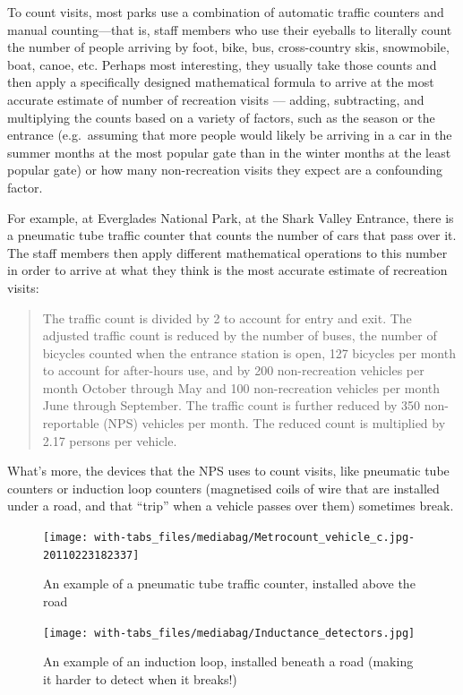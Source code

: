\documentclass[
  letterpaper,
  DIV=11,
  numbers=noendperiod]{scrartcl}
\begin{document}
To count visits, most parks use a combination of automatic traffic
counters and manual counting---that is, staff members who use their
eyeballs to literally count the number of people arriving by foot, bike,
bus, cross-country skis, snowmobile, boat, canoe, etc. Perhaps most
interesting, they usually take those counts and then apply a
specifically designed mathematical formula to arrive at the most
accurate estimate of number of recreation visits --- adding,
subtracting, and multiplying the counts based on a variety of factors,
such as the season or the entrance (e.g.~assuming that more people would
likely be arriving in a car in the summer months at the most popular
gate than in the winter months at the least popular gate) or how many
non-recreation visits they expect are a confounding factor.

For example, at Everglades National Park, at the Shark Valley Entrance,
there is a pneumatic tube traffic counter that counts the number of cars
that pass over it. The staff members then apply different mathematical
operations to this number in order to arrive at what they think is the
most accurate estimate of recreation visits:

\begin{quote}
The traffic count is divided by 2 to account for entry and exit. The
adjusted traffic count is reduced by the number of buses, the number of
bicycles counted when the entrance station is open, 127 bicycles per
month to account for after-hours use, and by 200 non-recreation vehicles
per month October through May and 100 non-recreation vehicles per month
June through September. The traffic count is further reduced by 350
non-reportable (NPS) vehicles per month. The reduced count is multiplied
by 2.17 persons per vehicle.
\end{quote}

What's more, the devices that the NPS uses to count visits, like
pneumatic tube counters or induction loop counters (magnetised coils of
wire that are installed under a road, and that ``trip'' when a vehicle
passes over them) sometimes break.

\begin{figure}[H]

{\centering \texttt{[image: with-tabs\_files/mediabag/Metrocount\_vehicle\_c.jpg-20110223182337]}

}

\caption{An example of a pneumatic tube traffic counter, installed above
the road}

\end{figure}%
\begin{figure}[H]

{\centering \texttt{[image: with-tabs\_files/mediabag/Inductance\_detectors.jpg]}

}

\caption{An example of an induction loop, installed beneath a road
(making it harder to detect when it breaks!)}

\end{figure}%
\end{document}
